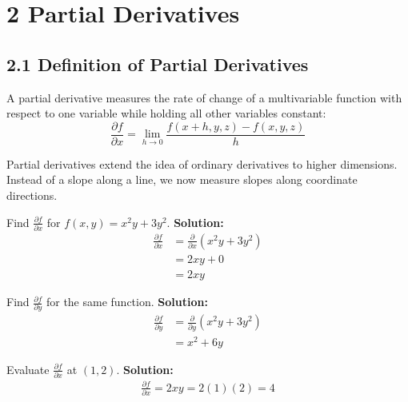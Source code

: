\section*{2 Partial Derivatives}

\subsection*{2.1 Definition of Partial Derivatives}

\begin{conceptbox}
    A partial derivative measures the rate of change of a multivariable function with respect to one variable while holding all other variables constant:
    \begin{equation*}
        \frac{\partial f}{\partial x} = \lim_{h \to 0} \frac{f(x+h, y, z) - f(x, y, z)}{h}
    \end{equation*}
\end{conceptbox}

Partial derivatives extend the idea of ordinary derivatives to higher dimensions. Instead of a slope along a line, we now measure slopes along coordinate directions.

\begin{examplebox}
    Find $\frac{\partial f}{\partial x}$ for $f(x,y)=x^2y+3y^2$.
    \newline \textbf{Solution:}
    \begin{align*}
        \frac{\partial f}{\partial x} & = \frac{\partial}{\partial x}(x^2y+3y^2) \\
                                      & = 2xy + 0                                \\
                                      & = 2xy
    \end{align*}
\end{examplebox}

\begin{examplebox}
    Find $\frac{\partial f}{\partial y}$ for the same function.
    \newline \textbf{Solution:}
    \begin{align*}
        \frac{\partial f}{\partial y} & = \frac{\partial}{\partial y}(x^2y+3y^2) \\
                                      & = x^2 + 6y
    \end{align*}
\end{examplebox}

\begin{examplebox}
    Evaluate $\frac{\partial f}{\partial x}$ at $(1,2)$.
    \newline \textbf{Solution:}
    \begin{align*}
        \frac{\partial f}{\partial x} = 2xy = 2(1)(2)=4
    \end{align*}
\end{examplebox}